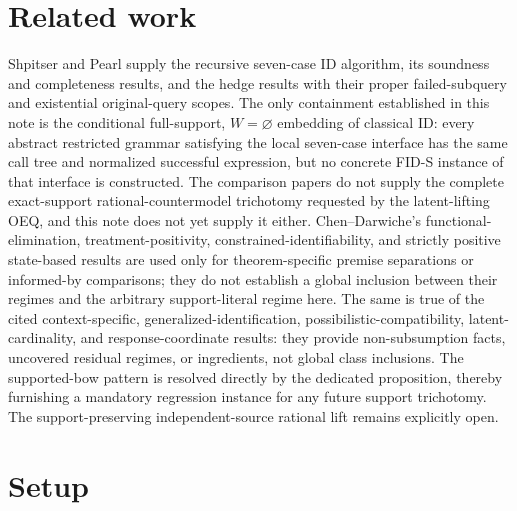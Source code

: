 \documentclass{article}
\begin{document}
\section{Related work}

Shpitser and Pearl supply the recursive seven-case ID algorithm, its soundness and completeness results, and the hedge results with their proper failed-subquery and existential original-query scopes. The only containment established in this note is the conditional full-support, \(W=\varnothing\) embedding of classical ID: every abstract restricted grammar satisfying the local seven-case interface has the same call tree and normalized successful expression, but no concrete FID-S instance of that interface is constructed. The comparison papers do not supply the complete exact-support rational-countermodel trichotomy requested by the latent-lifting OEQ, and this note does not yet supply it either. Chen--Darwiche's functional-elimination, treatment-positivity, constrained-identifiability, and strictly positive state-based results are used only for theorem-specific premise separations or informed-by comparisons; they do not establish a global inclusion between their regimes and the arbitrary support-literal regime here. The same is true of the cited context-specific, generalized-identification, possibilistic-compatibility, latent-cardinality, and response-coordinate results: they provide non-subsumption facts, uncovered residual regimes, or ingredients, not global class inclusions. The supported-bow pattern is resolved directly by the dedicated proposition, thereby furnishing a mandatory regression instance for any future support trichotomy. The support-preserving independent-source rational lift remains explicitly open.

\section{Setup}
\end{document}
